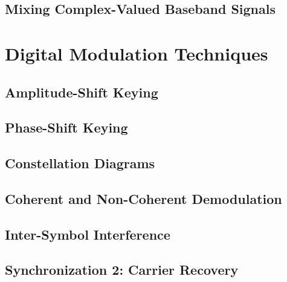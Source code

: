 \begin{refsection}

\subsection{Mixing Complex-Valued Baseband Signals}



\section{Digital Modulation Techniques}

\subsection{Amplitude-Shift Keying}

\subsection{Phase-Shift Keying}

\subsection{Constellation Diagrams}






\subsection{Coherent and Non-Coherent Demodulation}

\subsection{Inter-Symbol Interference}

\subsection{Synchronization 2: Carrier Recovery}



{}
\printbibliography[heading=subbibliography]
\end{refsection}

